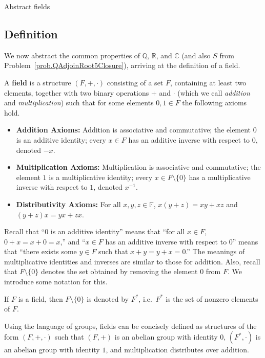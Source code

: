 \begin{section}{Abstract fields}
\subsection{Definition}

We now abstract the common properties of $\mathbb{Q}$, $\mathbb{R}$, and $\mathbb{C}$ (and also $S$ from Problem~\ref{prob.QAdjoinRoot5Closure}), arriving at the definition of a field. 

\begin{definition}
A \textbf{field} is a structure $(F,+,\cdot)$ consisting of a set $F$, containing at least two elements, together with two binary operations $+$ and $\cdot$ (which we call \emph{addition} and \emph{multiplication}) such that for some elements $0,1\in F$ the following axioms hold.
\begin{itemize}
\item \textbf{Addition Axioms:} Addition is associative and commutative; the element $0$ is an additive identity; every  $x\in F$ has an additive inverse with respect to $0$, denoted $-x$.
\item \textbf{Multiplication Axioms:} Multiplication is associative and commutative; the element $1$ is a multiplicative identity;  every $x\in F\setminus\{0\}$ has a multiplicative inverse with respect to $1$, denoted $x^{-1}$.
\item \textbf{Distributivity Axioms:} For all $x,y,z \in \mathbb{F}$, $x(y+z) = xy+xz$ and $(y+z)x = yx+zx$.
\end{itemize}
\end{definition}

Recall that ``$0$ is an additive identity'' means that ``for all $x\in F$, $0+x = x+0 = x$,'' and ``$x\in F$ has an additive inverse with respect to $0$'' means that ``there exists some $y\in F$ such that $x+y = y+x = 0$.'' The meanings of multiplicative identities and inverses are similar to those for addition. Also, recall that $F\setminus\{0\}$ denotes the set obtained by removing the element $0$ from $F$. We introduce some notation for this.

\begin{definition}
If $F$ is a field, then $F\setminus\{0\}$ is denoted by $F^*$, i.e.~$F^*$ is the set of nonzero elements of $F$.
\end{definition}

Using the language of groups, fields can be concisely defined as structures of the form $(F,+,\cdot)$ such that $(F,+)$ is an abelian group with identity $0$,  $(F^*,\cdot)$ is an abelian group with identity $1$, and multiplication distributes over addition.


\end{section}
